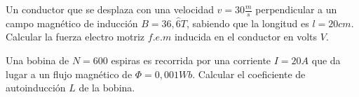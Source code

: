 \documentclass[./examen.tex]{subfiles}
\begin{document}
\begin{center}
\end{center}
\begin{questions}

 \question[5] Un conductor que se desplaza con una velocidad $v=30\frac{m}{s}$ perpendicular a un campo magnético de inducción $B=36,\hat{6}T$, sabiendo que la longitud es $l=20cm$. Calcular la fuerza electro motriz $f.e.m$ inducida en el conductor en volts $V$.
 
 \begin{center}
 \end{center}
 
 \question[5]  Una bobina de $N=600$ espiras es recorrida por una corriente $I=20A$ que da lugar a un flujo magnético de $\Phi=0,001Wb$. Calcular el coeficiente de autoinducción $L$ de la bobina.
 \vspace{1cm}
 \end{questions}
 
 
\end{document}
